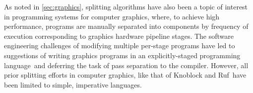 As noted in \ref{sec:graphics}, splitting algorithms have also been a
topic of interest in programming systems for computer graphics, where,
to achieve high performance, programs are manually separated into
components by frequency of execution corresponding to graphics
hardware pipeline stages. The software engineering challenges of
modifying multiple per-stage programs have led to suggestions of
writing graphics programs in an explicitly-staged programming
language\,\cite{Proudfoot:2001,Foley:2011,He:2014} and deferring the
task of pass separation to the compiler. However, all prior splitting
efforts in computer graphics, like that of Knoblock and
Ruf\,\cite{knoblock96} have been limited to simple, imperative
languages.



